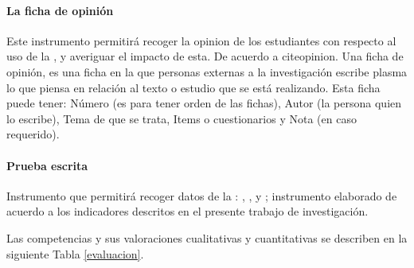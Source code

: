 \documentclass[12pt,a4paper]{article}
\begin{document}
%
%
%
\paragraph{La ficha de opinión}
%
Este instrumento permitirá recoger la opinion de los estudiantes con respecto al uso de la \MakeTextLowercase{\variablei}, y averiguar el impacto de esta. De acuerdo a cite{opinion}. Una ficha de opinión, es una ficha en la que personas externas a la investigación escribe plasma lo que piensa en relación al texto o estudio que se está realizando.
%
%
%
Esta ficha puede tener: Número (es para tener orden de las fichas), Autor (la persona quien lo escribe), Tema de que se trata, Items o cuestionarios y Nota (en caso requerido).
%
%
%
\paragraph{Prueba escrita} Instrumento que permitirá recoger datos de la \MakeTextLowercase{\variablei}: \MakeTextLowercase{\dimd},  \MakeTextLowercase{\dimdd}, \MakeTextLowercase{\dimddd} y \MakeTextLowercase{\dimdddd}; instrumento elaborado de acuerdo a los indicadores descritos en el presente trabajo de investigación.

Las competencias y sus valoraciones cualitativas y cuantitativas se describen en la siguiente Tabla \ref{evaluacion}.
\end{document}
